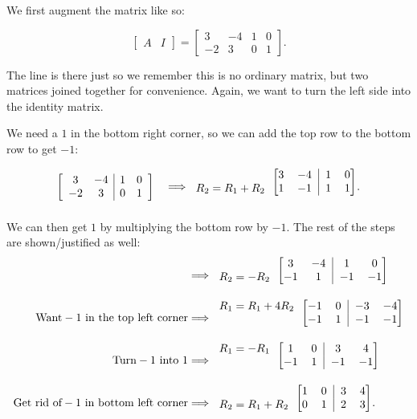 \documentclass[../gatm.tex]{subfiles}
\begin{document}
We first augment the matrix like so:

$$\left[\begin{array}{c|c}A & I \end{array}\right] = \left[\begin{array}{cc|cc} 3 & -4 & 1 & 0 \\ -2 & 3 & 0 & 1 \end{array}\right].$$

\noindent The line is there just so we remember this is no ordinary matrix, but two matrices joined together for convenience. Again, we want to turn the left side into the identity matrix.

We need a $1$ in the bottom right corner, so we can add the top row to the bottom row to get $-1$:

$$\left[\begin{array}{cc|cc} 3 & -4 & 1 & 0 \\ -2 & 3 & 0 & 1 \end{array}\right]\quad\Longrightarrow
\begin{blockarray}{c[cc|cc]}
& 3 & -4 & 1 & 0 \\ 
R_2=R_1+R_2 & 1 & -1 & 1 & 1
\end{blockarray}.$$

\noindent We can then get $1$ by multiplying the bottom row by $-1$. The rest of the steps are shown/justified as well:
\begin{align*}
&\Longrightarrow
\begin{blockarray}{c[cc|cc]}
& 3 & -4 & 1 & 0 \\ 
R_2=-R_2 & -1 & 1 & -1 & -1
\end{blockarray} \\
\text{Want}-1\text{ in the top left corner} &\Longrightarrow
\begin{blockarray}{c[cc|cc]}
R_1=R_1+4R_2 & -1 & 0 & -3 & -4 \\ 
& -1 & 1 & -1 & -1
\end{blockarray} \\
\text{Turn}-1\text{ into }1 &\Longrightarrow
\begin{blockarray}{c[cc|cc]}
R_1=-R_1 & 1 & 0 & 3 & 4 \\ 
& -1 & 1 & -1 & -1
\end{blockarray} \\
\text{Get rid of}-1\text{ in bottom left corner}&\Longrightarrow
\begin{blockarray}{c[cc|cc]}
& 1 & 0 & 3 & 4 \\ 
R_2=R_1+R_2 & 0 & 1 & 2 & 3
\end{blockarray}. \\
\end{align*}
\end{document}
